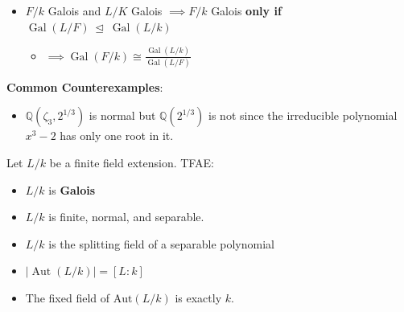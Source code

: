 \begin{center}
\end{center}

\begin{itemize}
\tightlist
\item
  \(F/k\) Galois and \(L/K\) Galois \(\implies F/k\) Galois \textbf{only
  if}
  \(\operatorname{Gal}(L/F) {~\trianglelefteq~}\operatorname{Gal}(L/k)\)

  \begin{itemize}
  \tightlist
  \item
    \(\implies \operatorname{Gal}(F/k) \cong \frac{\operatorname{Gal}(L/k)}{\operatorname{Gal}(L/F)}\)
  \end{itemize}
\end{itemize}

\begin{center}
\end{center}

\textbf{Common Counterexamples}:

\begin{itemize}
\tightlist
\item
  \({\mathbb{Q}}(\zeta_3, 2^{1/3})\) is normal but
  \({\mathbb{Q}}(2^{1/3})\) is not since the irreducible polynomial
  \(x^3 - 2\) has only one root in it.
\end{itemize}

\begin{definition}

Let \(L/k\) be a finite field extension. TFAE:

\begin{itemize}
\tightlist
\item
  \(L/k\) is \textbf{Galois}
\item
  \(L/k\) is finite, normal, and separable.
\item
  \(L/k\) is the splitting field of a separable polynomial
\item
  \({\left\lvert {{\operatorname{Aut}}(L/k)} \right\rvert} = [L: k]\)
\item
  The fixed field of \(\mathrm{Aut}(L/k)\) is exactly \(k\).
\end{itemize}

\end{definition}

